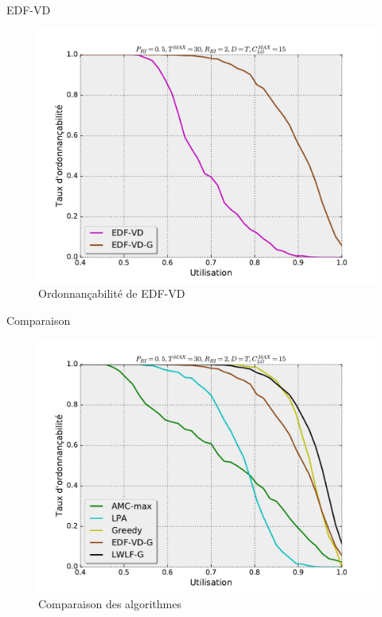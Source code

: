 \documentclass{bredelebeamer}
\begin{document}
\begin{frame}{EDF-VD}
\begin{figure}[h]
\includegraphics[width=\textwidth,height=0.8\textheight,keepaspectratio]{./results/perfEDFVD.pdf}
\caption{Ordonnançabilité de EDF-VD}
\label{res:edfvd}
\end{figure}
\end{frame}


\begin{frame}{Comparaison}
\begin{figure}[h]
\includegraphics[width=\textwidth,height=0.8\textheight,keepaspectratio]{./results/perfComp.pdf}
\caption{Comparaison des algorithmes}
\label{res:full}
\end{figure}
\end{frame}
\end{document}
